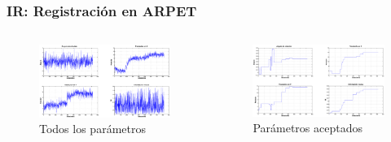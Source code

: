 \documentclass{beamer} %
\begin{document}
\begin{frame}
\frametitle{IR: Registración en ARPET}

\begin{columns}[onlytextwidth]
\begin{column}{.5\textwidth}
\begin{figure}
  \includegraphics[width=\textwidth]{images/7-all.eps}
  \caption{Todos los parámetros}
\end{figure}
\end{column}
\hfill
\begin{column}{.5\textwidth}
\begin{figure}
  \includegraphics[width=\textwidth]{images/7-accepted.eps}
  \caption{Parámetros aceptados}
\end{figure}
\end{column}
\end{columns}

\end{frame}
\end{document}

